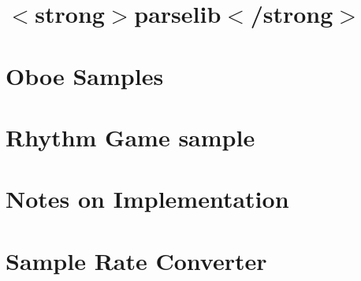 \let\mypdfximage\pdfximage\def\pdfximage{\immediate\mypdfximage}\documentclass[twoside]{book}
\newcommand{\+}{\discretionary{\mbox{\scriptsize$\hookleftarrow$}}{}{}}
\begin{document}
\chapter{$<$strong$>$parselib$<$/strong$>$}
\label{md__c_1__users_fab_src__github_branches__neural_amp_modeler_plugin_i_plug2__dependencies__build_687a01727beb57fd28852c7f5fe0df70}

\chapter{Oboe Samples}
\label{md__c_1__users_fab_src__github_branches__neural_amp_modeler_plugin_i_plug2__dependencies__build_9c709dece4d4d70eb4f99fb3d82dd039}

\chapter{Rhythm Game sample}
\label{md__c_1__users_fab_src__github_branches__neural_amp_modeler_plugin_i_plug2__dependencies__build_cc02197d1ad596bb55b2c6647402dd5d}

\chapter{Notes on Implementation}
\label{md__c_1__users_fab_src__github_branches__neural_amp_modeler_plugin_i_plug2__dependencies__build_ad58aafa613c39a0b1d1b73090bbe474}

\chapter{Sample Rate Converter}
\label{md__c_1__users_fab_src__github_branches__neural_amp_modeler_plugin_i_plug2__dependencies__build_f7de5b9613c2c5e608c30a7accce01a8}

\end{document}
